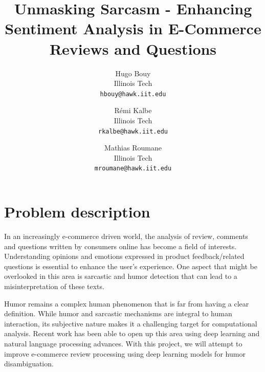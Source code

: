 \documentclass[10pt,twocolumn,letterpaper]{article}
\begin{document}
\title{Unmasking Sarcasm - Enhancing Sentiment Analysis in E-Commerce Reviews and Questions
}

\author{Hugo Bouy\\
Illinois Tech\\
{\tt\small hbouy@hawk.iit.edu}
\and
Rémi Kalbe\\
Illinois Tech\\
{\tt\small rkalbe@hawk.iit.edu}
\and
Mathias Roumane\\
Illinois Tech\\
{\tt\small mroumane@hawk.iit.edu}
}
\maketitle




\section{Problem description}
\label{sec:intro}
In an increasingly e-commerce driven world, the analysis of review, comments and questions written by consumers online has become a field of interests.
Understanding opinions and emotions expressed in product feedback/related questions is essential to enhance the user’s experience.
One aspect that might be overlooked in this area is sarcastic and humor detection that can lead to a misinterpretation of these texts.

Humor remains a complex human phenomenon that is far from having a clear definition.
While humor and sarcastic mechanisms are integral to human interaction, its subjective nature makes it a challenging target for computational analysis.
Recent work has been able to open up this area using deep learning and natural language processing advances.
With this project, we will attempt to improve e-commerce review processing using deep learning models for humor disambiguation.
\end{document}
